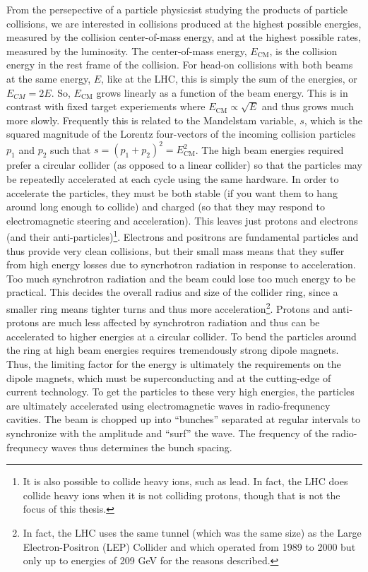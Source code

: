 From the persepective
of a particle physicsist studying the products of particle collisions, we 
are interested in collisions produced at the highest possible energies,
measured by the collision center-of-mass energy, and at the highest possible rates, 
measured by the luminosity.
The center-of-mass energy, $E_{\textrm{CM}}$, is the collision energy 
in the rest frame
of the collision. For head-on collisions with both beams at the same
energy, $E$, like at the LHC, this is simply the sum of the energies, 
or $E_{CM} = 2 E$. So, $E_{\textrm{CM}}$ grows linearly as a function
of the beam energy. This is in contrast with fixed target experiements
where $E_{\textrm{CM}} \propto \sqrt{E}$ and thus grows much more slowly. 
Frequently this is related to the Mandelstam variable,
$s$, which is the squared magnitude of the Lorentz four-vectors
of the incoming collision particles $p_1$ and $p_2$ such that
$s = (p_1+p_2)^2 = E_\textrm{CM}^2$.
The high beam energies required prefer a circular collider (as opposed
to a linear collider) so that the particles may be repeatedly 
accelerated at each cycle using the same hardware.
In order to accelerate the particles, they must be both stable (if you
want them to hang around long enough to collide) and charged (so
that they may respond to electromagnetic steering and acceleration).
This leaves just protons and electrons (and their anti-particles)\footnote{It is also
possible to collide heavy ions, such as lead. In fact, the LHC does collide
heavy ions when it is not colliding protons, though that is not the focus of this
thesis.}.
Electrons and positrons are fundamental particles and thus provide
very clean collisions, but their small mass means that they suffer
from high energy losses due to syncrhotron radiation in response to acceleration. 
Too much synchrotron radiation and the beam could lose too much energy
to be practical. 
This decides the overall radius and size of the collider ring, since a smaller
ring means tighter turns and thus more acceleration\footnote{In fact, 
the LHC uses the same tunnel (which was the same size) as 
the Large Electron-Positron (LEP) Collider and which
operated from 1989 to 2000 but only up to energies of 209 GeV for the reasons
described.}.
Protons and anti-protons are much less affected by synchrotron radiation
and thus can be accelerated to higher energies at a circular collider.
To bend the particles around the ring at high beam energies 
requires tremendously strong dipole magnets. 
Thus, the limiting factor for the energy is ultimately the requirements
on the dipole magnets, which must be superconducting and at the cutting-edge 
of current technology.
To get the particles to these very high energies, the particles
are ultimately accelerated using electromagnetic waves in radio-frequnency cavities.
The beam is chopped up into ``bunches'' separated at regular intervals
to synchronize with the amplitude and ``surf'' the wave.  The frequency
of the radio-frequnecy waves thus determines the bunch spacing.


